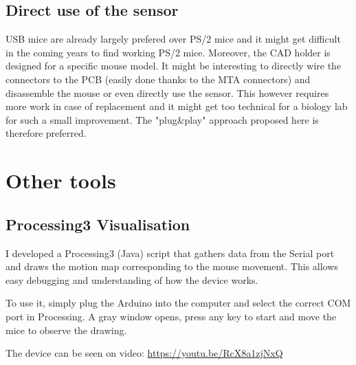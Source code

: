 \documentclass[a4paper]{article}
\begin{document}
\subsection{Direct use of the sensor}
USB mice are already largely prefered over PS/2 mice and it might get difficult in the coming years to find working PS/2 mice. Moreover, the CAD holder is designed for a specific mouse model.
It might be interesting to directly wire the connectors to the PCB (easily done thanks to the MTA connectors) and disassemble the mouse or even directly use the sensor.
This however requires more work in case of replacement and it might get too technical for a biology lab for such a small improvement. The "plug\&play" approach proposed here is therefore preferred.

\section{Other tools}
\subsection{Processing3 Visualisation}
\label{processing}
I developed a Processing3 (Java) script that gathers data from the Serial port and draws the motion map corresponding to the mouse movement. This allows easy debugging and understanding of how the device works.

To use it, simply plug the Arduino into the computer and select the correct COM port in Processing. A gray window opens, press any key to start and move the mice to observe the drawing.

The device can be seen on video: \url{https://youtu.be/RcX8a1zjNxQ}

\appendix




\end{document}
